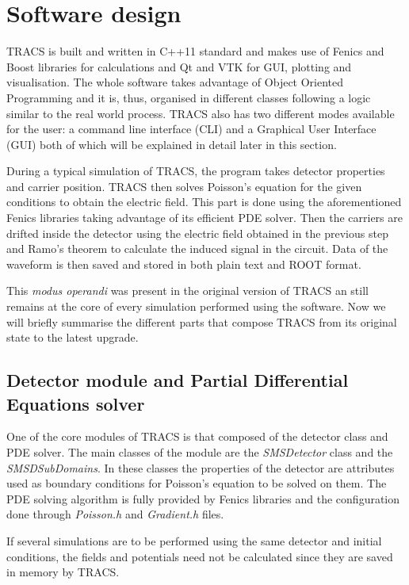 \section{Software design} %
\label{sec:results_and_achievements}

TRACS is built and written in C++11 standard and makes use of Fenics and Boost libraries for calculations and Qt and VTK for GUI, plotting and visualisation. The whole software takes advantage of Object Oriented Programming and it is, thus, organised in different classes following a logic similar to the real world process. TRACS also has two different modes available for the user: a command line interface (CLI) and a Graphical User Interface (GUI) both of which will be explained in detail later in this section.

During a typical simulation of TRACS, the program takes detector properties and carrier position. TRACS then solves Poisson's equation for the given conditions to obtain the electric field. This part is done using the aforementioned Fenics libraries taking advantage of its efficient PDE solver. Then the carriers are drifted inside the detector using the electric field obtained in the previous step and Ramo's theorem to calculate the induced signal in the circuit. Data of the waveform is then saved and stored in both plain text and ROOT format.

This \textit{modus operandi} was present in the original version of TRACS an still remains at the core of every simulation performed using the software. Now we will briefly summarise the different parts that compose TRACS from its original state to the latest upgrade.

\subsection{Detector module and Partial Differential Equations solver}

One of the core modules of TRACS is that composed of the detector class and PDE solver. The main classes of the module are the \textit{SMSDetector} class and the \textit{SMSDSubDomains}. In these classes the properties of the detector are attributes used as boundary conditions for Poisson's equation to be solved on them. The PDE solving algorithm is fully provided by Fenics libraries and the configuration done through \textit{Poisson.h} and \textit{Gradient.h} files.

If several simulations are to be performed using the same detector and initial conditions, the fields and potentials need not be calculated since they are saved in memory by TRACS. 

